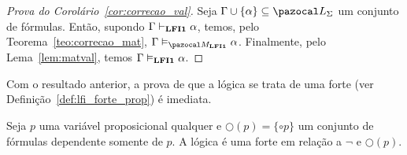     \begin{proof}[Prova do Corolário~\ref{cor:correcao_val}]
        Seja $\Gamma \cup \{\alpha\} \subseteq \ling{}$ um conjunto de fórmulas. Então, supondo $\Gamma \vdash_{{\normalfont\textbf{LFI1}}{}} \alpha$, temos, pelo Teorema~\ref{teo:correcao_mat}, $\Gamma \conmat \alpha$. Finalmente, pelo Lema~\ref{lem:matval}, temos $\Gamma \vDash_{{\normalfont\textbf{LFI1}}{}} \alpha$.
    \end{proof}

    Com o resultado anterior, a prova de que a lógica \lfium{} se trata de uma \lfi{} forte (ver Definição~\ref{def:lfi_forte_prop}) é imediata.

    \begin{corolario}\label{cor:lfi_forte}
        Seja $p$ uma variável proposicional qualquer e $\bigcirc(p) = \{\circ p\}$ um conjunto de fórmulas dependente somente de $p$. A lógica \lfium{} é uma \lfi{} forte em relação a $\neg$ e $\bigcirc(p)$.
    \end{corolario}

